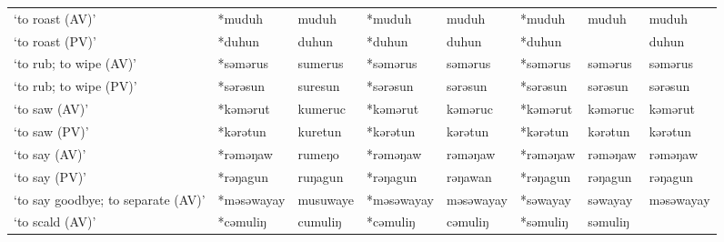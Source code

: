 \begin{landscape}
\begin{longtable}[c]{@{}p{3cm}<{\raggedright}p{2.75cm}<{\raggedright}p{2.75cm}<{\raggedright}p{2.75cm}<{\raggedright}p{2.75cm}<{\raggedright}p{2.75cm}<{\raggedright}p{2.75cm}<{\raggedright}p{2.75cm}<{\raggedright}@{}}
`to roast (AV)'                                      & *muduh             & muduh                          & *muduh             & muduh                      & *muduh           & muduh                    & muduh                             \\
`to roast (PV)'                                      & *duhun             & duhun                          & *duhun             & duhun                      & *duhun           &                          & duhun                             \\
`to rub; to wipe (AV)'                               & *səmərus           & sumerus                        & *səmərus           & səmərus                    & *səmərus         & səmərus                  & səmərus                           \\
`to rub; to wipe (PV)'                               & *sərəsun           & suresun                        & *sərəsun           & sərəsun                    & *sərəsun         & sərəsun                  & sərəsun                           \\
`to saw (AV)'                                        & *kəmərut           & kumeruc                        & *kəmərut           & kəməruc                    & *kəmərut         & kəməruc                  & kəmərut                           \\
`to saw (PV)'                                        & *kərətun           & kuretun                        & *kərətun           & kərətun                    & *kərətun         & kərətun                  & kərətun                           \\
`to say (AV)'                                        & *rəməŋaw           & rumeŋo                         & *rəməŋaw           & rəməŋaw                    & *rəməŋaw         & rəməŋaw                  & rəməŋaw                           \\
`to say (PV)'                                        & *rəŋagun           & ruŋagun                        & *rəŋagun           & rəŋawan                    & *rəŋagun         & rəŋagun                  & rəŋagun                           \\
`to say goodbye; to separate (AV)'                   & *məsəwayay         & musuwaye                       & *məsəwayay         & məsəwayay                  & *səwayay         & səwayay                  & məsəwayay                         \\
`to scald (AV)'                                      & *cəmuliŋ           & cumuliŋ                        & *cəmuliŋ           & cəmuliŋ                    & *səmuliŋ         & səmuliŋ                  &                                   \\

\end{longtable}
\end{landscape}
